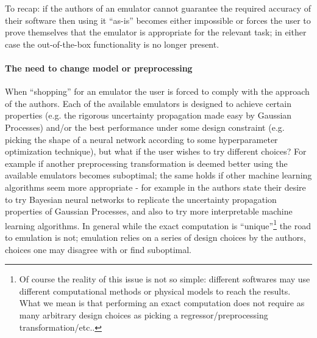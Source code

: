 To recap: if the authors of an emulator cannot guarantee the required accuracy of their software then using it ``as-is'' becomes either impossible or forces the user to prove themselves that the emulator is appropriate for the relevant task; in either case the out-of-the-box functionality is no longer present.

\paragraph{The need to change model or preprocessing}
When ``shopping'' for an emulator the user is forced to comply with the approach of the authors. Each of the available emulators is designed to achieve certain properties (e.g. the rigorous uncertainty propagation made easy by Gaussian Processes) and/or the best performance under some design constraint (e.g. picking the shape of a neural network according to some hyperparameter optimization technique), but what if the user wishes to try different choices? For example if another preprocessing transformation is deemed better using the available emulators becomes suboptimal; the same holds if other machine learning algorithms seem more appropriate - for example in \cite{cosmopower} the authors state their desire to try Bayesian neural networks to replicate the uncertainty propagation properties of Gaussian Processes, and also to try more interpretable machine learning algorithms. In general while the exact computation is ``unique''\footnote{Of course the reality of this issue is not so simple: different softwares may use different computational methods or physical models to reach the results. What we mean is that performing an exact computation does not require as many arbitrary design choices as picking a regressor/preprocessing transformation/etc..} the road to emulation is not; emulation relies on a series of design choices by the authors, choices one may disagree with or find suboptimal. %

